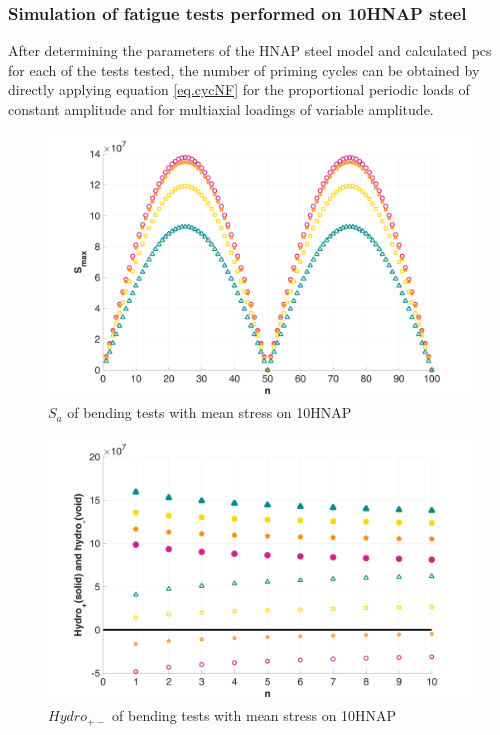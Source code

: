 \documentclass[3p,times,number,review]{elsarticle}
\begin{document}
\subsubsection{Simulation of fatigue tests performed on 10HNAP steel}
After determining the parameters of the HNAP steel model and calculated pcs for each of the tests tested, the number of priming cycles can be obtained by directly applying equation \eqref{eq.cycNF} for the proportional periodic loads of constant amplitude and for multiaxial loadings of variable amplitude.
\begin{figure}[!h]
	\centering
	\includegraphics[width=\textwidth]{figures//10HNAP_b1D_m_Smax.png} 
	\caption{$S_{a}$ of bending tests with mean stress on 10HNAP}
	\label{fig.10HNAPSmax}
\end{figure}
\begin{figure}[!h]
	\centering
	\includegraphics[width=\textwidth]{figures//10HNAP_b1D_m_hydro.png} 
	\caption{$Hydro_{+-}$ of bending tests with mean stress on 10HNAP}
	\label{fig.10HNAPhydro}
\end{figure}
\end{document}
